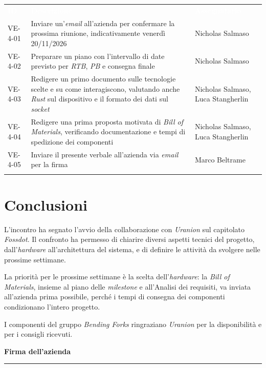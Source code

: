 \documentclass[12pt,a4paper]{article}
\begin{document}
\begin{center}
\begin{tabularx}{\linewidth}{>{\hsize=0.511\hsize\raggedright\arraybackslash}X>{\hsize=1.675\hsize\raggedright\arraybackslash}X>{\hsize=0.814\hsize\raggedright\arraybackslash}X}
\rowcolor{bfblue}\textcolor{white}{\textbf{ID}} & \textcolor{white}{\textbf{Descrizione}} & \textcolor{white}{\textbf{Assegnatario}} \\
VE-4-01 & Inviare un'\emph{email} all'azienda per confermare la prossima riunione, indicativamente venerdì 20/11/2026 & Nicholas Salmaso \\ \arrayrulecolor{bfline}\hline
VE-4-02 & Preparare un piano con l'intervallo di date previsto per \emph{RTB}, \emph{PB} e consegna finale & Nicholas Salmaso \\ \arrayrulecolor{bfline}\hline
VE-4-03 & Redigere un primo documento sulle tecnologie scelte e su come interagiscono, valutando anche \emph{Rust} sul dispositivo e il formato dei dati sul \emph{socket} & Nicholas Salmaso, Luca Stangherlin \\ \arrayrulecolor{bfline}\hline
VE-4-04 & Redigere una prima proposta motivata di \emph{Bill of Materials}, verificando documentazione e tempi di spedizione dei componenti & Nicholas Salmaso, Luca Stangherlin \\ \arrayrulecolor{bfline}\hline
VE-4-05 & Inviare il presente verbale all'azienda via \emph{email} per la firma & Marco Beltrame \\ \arrayrulecolor{bfline}\hline
\end{tabularx}
\end{center}

\break
\section{Conclusioni}

L'incontro ha segnato l'avvio della collaborazione con \emph{Uranion} sul capitolato \emph{Fossdot}. Il confronto ha permesso di chiarire diversi aspetti tecnici del progetto, dall'\emph{hardware} all'architettura del sistema, e di definire le attività da svolgere nelle prossime settimane.

La priorità per le prossime settimane è la scelta dell'\emph{hardware}: la \emph{Bill of Materials}, insieme al piano delle \emph{milestone} e all'Analisi dei requisiti, va inviata all'azienda prima possibile, perché i tempi di consegna dei componenti condizionano l'intero progetto.

I componenti del gruppo \emph{Bending Forks} ringraziano \emph{Uranion} per la disponibilità e per i consigli ricevuti.

\vspace{30pt}
\begin{flushright}
\textbf{Firma dell'azienda}\\[22pt]
\rule{60mm}{0.5pt}
\end{flushright}
\end{document}

